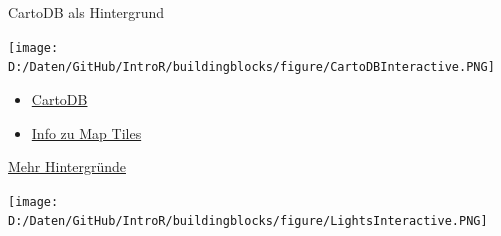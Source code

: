 \documentclass[ignorenonframetext,]{beamer}
\newenvironment{Shaded}{\begin{snugshade}}{\end{snugshade}}
\newcommand{\KeywordTok}[1]{\textcolor[rgb]{0.26,0.66,0.93}{\textbf{#1}}}
\newcommand{\StringTok}[1]{\textcolor[rgb]{0.02,0.61,0.04}{#1}}
\newcommand{\OperatorTok}[1]{\textcolor[rgb]{0.74,0.68,0.62}{#1}}
\newcommand{\NormalTok}[1]{\textcolor[rgb]{0.74,0.68,0.62}{#1}}
\begin{document}
\begin{frame}[fragile]{CartoDB als Hintergrund}

\begin{Shaded}
\end{Shaded}

\texttt{[image: D:/Daten/GitHub/IntroR/buildingblocks/figure/CartoDBInteractive.PNG]}

\begin{itemize}
\item
  \href{https://carto.com/attribution}{CartoDB}
\item
  \href{https://www.mapbox.com/help/how-web-maps-work/}{Info zu Map
  Tiles}
\end{itemize}

\end{frame}

\begin{frame}[fragile]{\href{http://leaflet-extras.github.io/leaflet-providers/preview/index.html}{Mehr
Hintergründe}}

\begin{Shaded}
\end{Shaded}

\texttt{[image: D:/Daten/GitHub/IntroR/buildingblocks/figure/LightsInteractive.PNG]}

\end{frame}
\end{document}
